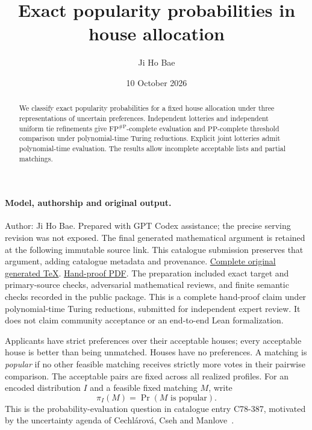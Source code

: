 \documentclass[11pt]{article}
\title{Exact popularity probabilities in house allocation}
\author{Ji Ho Bae}
\date{10 October 2026}
\newcommand{\PP}{\mathrm{PP}}
\newcommand{\FP}{\mathrm{FP}}
\newcommand{\sharpP}{\#\mathrm P}
\newcommand{\Prob}{\mathop{\mathrm{Pr}}}
\begin{document}
\maketitle

\paragraph{Model, authorship and original output.}
Author: Ji Ho Bae. Prepared with GPT Codex assistance; the precise serving
revision was not exposed. The final generated mathematical argument is
retained at the following immutable source link. This catalogue submission
preserves that argument, adding catalogue metadata and provenance.
\href{https://github.com/jbaelaw/house-allocation-popularity/blob/5eeef911b3a54337d6739e592ed5d96cb4e64f66/paper/Proof.tex}{Complete original generated TeX}.
\href{https://github.com/jbaelaw/house-allocation-popularity/blob/5eeef911b3a54337d6739e592ed5d96cb4e64f66/paper/Proof.pdf}{Hand-proof PDF}.
The preparation included exact target and primary-source checks, adversarial
mathematical reviews, and finite semantic checks recorded in the public
package. This is a complete hand-proof claim under polynomial-time Turing
reductions, submitted for independent expert review. It does not claim
community acceptance or an end-to-end Lean formalization.

\begin{abstract}
We classify exact popularity probabilities for a fixed house allocation under three representations of uncertain preferences. Independent lotteries and independent uniform tie refinements give $\FP^{\sharpP}$-complete evaluation and $\PP$-complete threshold comparison under polynomial-time Turing reductions. Explicit joint lotteries admit polynomial-time evaluation. The results allow incomplete acceptable lists and partial matchings.
\end{abstract}

Applicants have strict preferences over their acceptable houses; every acceptable house is better than being unmatched. Houses have no preferences. A matching is \emph{popular} if no other feasible matching receives strictly more votes in their pairwise comparison. The acceptable pairs are fixed across all realized profiles. For an encoded distribution $I$ and a feasible fixed matching $M$, write
\[
 \pi_I(M)=\Prob(M\text{ is popular}).
\]
This is the probability-evaluation question in catalogue entry C78-387, motivated by the uncertainty agenda of Cechl\'arov\'a, Cseh and Manlove~\cite[\S3.1.2]{survey}.
\end{document}
